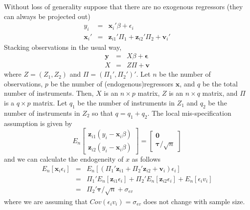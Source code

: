 \documentclass[12pt]{article}
\theoremstyle{definition}
\begin{document}
Without loss of generality suppose that there are no exogenous regressors (they can always be projected out)
\begin{eqnarray}
    y_i &=& \mathbf{x}_i' \beta +  \epsilon_i\\
    \mathbf{x}_i' &=& \mathbf{z}_{i1}' \Pi_1 + \mathbf{z}_{i2}' \Pi_2 + \mathbf{v}_i' 
\end{eqnarray}
Stacking observations in the usual way,
\begin{eqnarray}
  \mathbf{y} &=& X\beta +\boldsymbol{\epsilon}\\
  X &=&  Z \Pi + \mathbf{v}
\end{eqnarray}
where $Z = (Z_1, Z_2)$ and $\Pi = (\Pi_1', \Pi_2')'$. Let $n$ be the number of observations, $p$ be the number of (endogenous)regressors $\textbf{x}$, and $q$ be the total number of instruments. Then, $X$ is an $n\times p$ matrix, $Z$ is an $n\times q$ matrix, and $\Pi$ is a $q\times p$ matrix. Let $q_1$ be the number of instruments in $Z_1$ and $q_2$ be the number of instruments in $Z_2$ so that $q = q_1 + q_2$. The local mis-specification assumption is given by
\begin{equation}
  E_n\left[\begin{array}
    {c}
    \textbf{z}_{i1} (y_i - \textbf{x}_i\beta) \\
    \textbf{z}_{i2} (y_i - \textbf{x}_i \beta)
\end{array}\right] = \left[
  \begin{array}
    {c}
    \textbf{0} \\ \boldsymbol{\tau}/\sqrt{n}
  \end{array}
\right]
\end{equation}
and we can calculate the endogeneity of $x$ as follows
\begin{eqnarray*}
  E_n[\mathbf{x}_i \epsilon_i] &=& E_n[(\Pi_1'\mathbf{z}_{i1} +  \Pi_2'\mathbf{z}_{i2} + \mathbf{v}_i)\epsilon_i]\\
    &=&\Pi_1' E_n[\mathbf{z}_{i1}\epsilon_i] + \Pi_2' E_n[\mathbf{z}_{i2}\epsilon_i] + E_n[\epsilon_i v_i]\\
    &=& \Pi_2' \boldsymbol{\tau}/\sqrt{n} + \sigma_{\epsilon v}
\end{eqnarray*}
where we are assuming that $Cov(\epsilon_i v_i) = \sigma_{\epsilon v}$ does not change with sample size.
\end{document}
